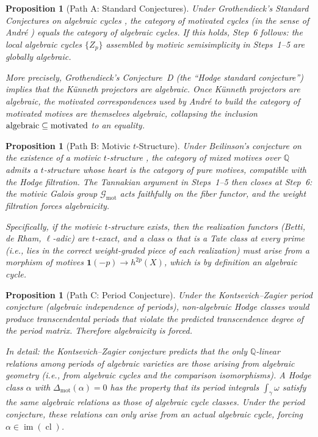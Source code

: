 \documentclass[11pt]{article}
\newtheorem{proposition}[theorem]{Proposition}
\theoremstyle{definition}
\DeclareMathOperator{\cl}{cl}
\DeclareMathOperator{\im}{im}
\begin{document}
\begin{proposition}[Path A: Standard Conjectures]
\label{prop:path-A}
Under Grothendieck's Standard Conjectures on algebraic cycles
\cite{Grothendieck}, the category of motivated cycles (in the sense of
Andr\'e \cite{Andre}) equals the category of algebraic cycles.  If this holds,
Step~6 follows: the local algebraic cycles $\{Z_p\}$ assembled by motivic
semisimplicity in Steps~1--5 are globally algebraic.

More precisely, Grothendieck's Conjecture~D (the ``Hodge standard conjecture'')
implies that the K\"unneth projectors are algebraic.  Once K\"unneth projectors
are algebraic, the motivated correspondences used by Andr\'e to build the
category of motivated motives are themselves algebraic, collapsing the inclusion
$\textup{algebraic} \subseteq \textup{motivated}$ to an equality.
\end{proposition}

\begin{proposition}[Path B: Motivic $t$-Structure]
\label{prop:path-B}
Under Beilinson's conjecture on the existence of a motivic $t$-structure
\cite{Beilinson}, the category of mixed motives over $\mathbb{Q}$ admits a
$t$-structure whose heart is the category of pure motives, compatible with
the Hodge filtration.  The Tannakian argument in Steps~1--5 then closes at
Step~6: the motivic Galois group
$\mathcal{G}_{\mathrm{mot}}$ acts faithfully on the fiber functor, and the
weight filtration forces algebraicity.

Specifically, if the motivic $t$-structure exists, then the realization
functors (Betti, de Rham, $\ell$-adic) are $t$-exact, and a class
$\alpha$ that is a Tate class at every prime (i.e., lies in the correct
weight-graded piece of each realization) must arise from a morphism of
motives $\mathbf{1}(-p) \to h^{2p}(X)$, which is by definition an algebraic
cycle.
\end{proposition}

\begin{proposition}[Path C: Period Conjecture]
\label{prop:path-C}
Under the Kontsevich--Zagier period conjecture \cite{KZ} (algebraic
independence of periods), non-algebraic Hodge classes would produce
transcendental periods that violate the predicted transcendence degree of
the period matrix.  Therefore algebraicity is forced.

In detail: the Kontsevich--Zagier conjecture predicts that the only
$\mathbb{Q}$-linear relations among periods of algebraic varieties are those
arising from algebraic geometry (i.e., from algebraic cycles and the
comparison isomorphisms).  A Hodge class $\alpha$ with
$\Delta_{\mathrm{mot}}(\alpha) = 0$ has the property that its period integrals
$\int_\gamma \omega$ satisfy the same algebraic relations as those of
algebraic cycle classes.  Under the period conjecture, these relations can
only arise from an actual algebraic cycle, forcing $\alpha \in \im(\cl)$.
\end{proposition}
\end{document}
